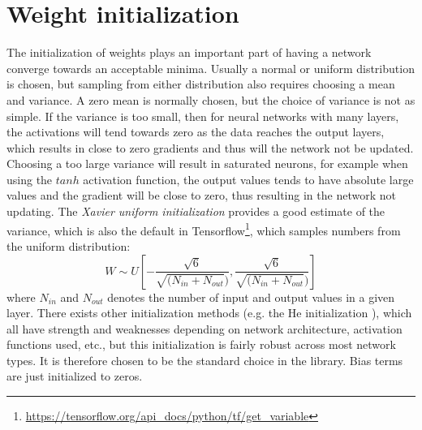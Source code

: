 \section{Weight initialization}
The initialization of weights plays an important part of having a network
converge towards an acceptable minima. Usually a normal or uniform distribution
is chosen, but sampling from either distribution also requires choosing a mean
and variance. A zero mean is normally chosen, but the choice of variance is not
as simple. If the variance is too small, then for neural networks with many
layers, the activations will tend towards zero as the data reaches the output
layers, which results in close to zero gradients and thus will the network not
be updated. Choosing a too large variance will result in saturated neurons, for
example when using the $tanh$ activation function, the output values tends to
have absolute large values and the gradient will be close to zero, thus
resulting in the network not updating. The \emph{Xavier uniform initialization}
\cite{Glorot10understandingthe} provides a good estimate of the variance, which
is also the default in
Tensorflow\footnote{\url{https://tensorflow.org/api_docs/python/tf/get_variable}},
which samples numbers from the uniform distribution:
\begin{equation}
W \sim   U\left[ - \frac{ \sqrt{6}}{ \sqrt{(N_{in} + N_{out}} )}, \frac{
	\sqrt{6}}{ \sqrt{(N_{in} + N_{out}} )} \right]
\end{equation}
where $N_{in}$ and $N_{out}$ denotes the number of input and output values in a
given layer. There exists other initialization methods (e.g. the He
initialization \cite{He:2015:DDR:2919332.2919814}), which all have strength and
weaknesses depending on network architecture, activation functions used, etc.,
but this initialization is fairly robust across most network types. It is
therefore chosen to be the standard choice in the library. Bias terms are just
initialized to zeros. 

